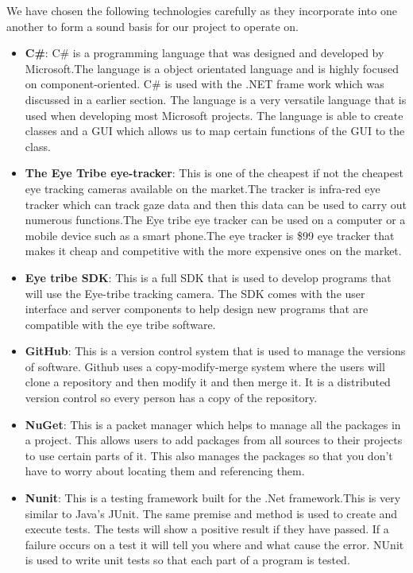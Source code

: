 We have chosen the following technologies carefully as they incorporate into one another to form a sound basis for our project to operate on.

\begin{itemize}
	\item \textbf{C\#}:	C\# is a programming language that was designed and developed by Microsoft.The language is a object orientated language and is highly focused on component-oriented. C\# is used with the .NET frame work which was discussed in a earlier section. The language is a very versatile language that is used when developing most Microsoft projects. The language is able to create classes and a GUI which allows us to map certain functions of the GUI to the class.
	
	\item \textbf{The Eye Tribe eye-tracker}: This is one of the cheapest if not the cheapest eye tracking cameras available on the market.The tracker is infra-red eye tracker which can track gaze data and then this data can be used to carry out numerous functions.The Eye tribe eye tracker can be used on a computer or a mobile device such as a smart phone.The eye tracker is \$99 eye tracker that makes it cheap and competitive with the more expensive ones on the market.
	
	\item \textbf{Eye tribe SDK}: This is a full SDK that is used to develop programs that will use the Eye-tribe tracking camera. The SDK comes with the user interface and server components to help design new programs that are compatible with the eye tribe software.
	
	\item \textbf{GitHub}: This is a version control system that is used to manage the versions of software. Github uses a copy-modify-merge system where the users will clone a repository and then modify it and then merge it. It is a distributed version control so every person has a copy of the repository.
	
		\item \textbf{NuGet}: This is a packet manager which helps to manage all the packages in a project. This allows users to add packages from all sources to their projects to use certain parts of it. This also manages the packages so that you don't have to worry about locating them and referencing them.
		
		\item \textbf{Nunit}: This is a testing framework built for the .Net framework.This is very similar to Java's JUnit. The same premise and method is used to create and execute tests. The tests will show a positive result if they have passed. If a failure occurs on a test it will tell you where and what cause the error.  NUnit is used to write unit tests so that each part of a program is tested.
		

\end{itemize}
